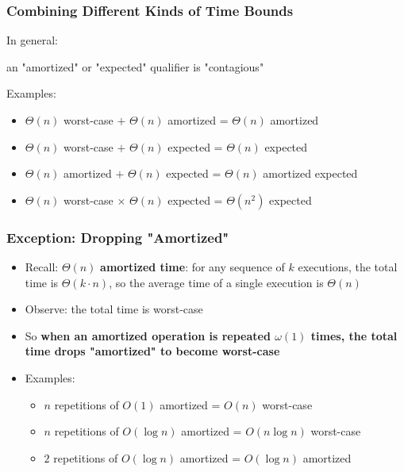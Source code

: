 \documentclass{beamer}
\begin{document}
\begin{frame} \frametitle{Combining Different Kinds of Time Bounds}
  In general:
  \begin{center}
    an "amortized" or "expected" qualifier is "contagious"
  \end{center}

  Examples:
  \begin{itemize}
    \item $\Theta(n)$ worst-case $+$ $\Theta(n)$ amortized = $\Theta(n)$ amortized
    \item $\Theta(n)$ worst-case $+$ $\Theta(n)$ expected = $\Theta(n)$ expected
    \item $\Theta(n)$ amortized $+$ $\Theta(n)$ expected = $\Theta(n)$ amortized expected
    \item $\Theta(n)$ worst-case $\times$ $\Theta(n)$ expected = $\Theta(n^2)$ expected
  \end{itemize}
\end{frame}

\begin{frame} \frametitle{Exception: Dropping "Amortized"}
  \begin{itemize}
    \item Recall: $\Theta(n)$ \textbf{amortized time}: for any sequence of $k$ executions, the total time is $\Theta(k \cdot n)$, so the average time of a single execution is $\Theta(n)$
    \item Observe: the total time is worst-case
    \item So \textbf{when an amortized operation is repeated $\omega(1)$ times, the total time drops "amortized" to become worst-case}
    \item Examples:
    \begin{itemize}
      \item $n$ repetitions of $O(1)$ amortized = $O(n)$ worst-case
      \item $n$ repetitions of $O(\log n)$ amortized = $O(n \log n)$ worst-case
      \item $2$ repetitions of $O(\log n)$ amortized = $O(\log n)$ amortized
    \end{itemize}
  \end{itemize}
\end{frame}
\end{document}
